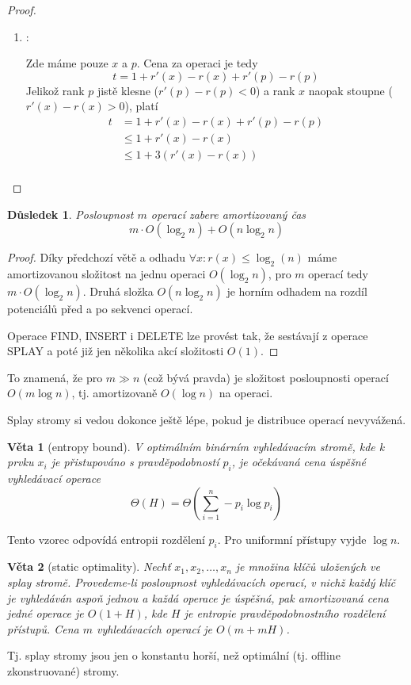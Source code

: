 \documentclass[11pt]{report} %
\newtheorem{theorem}{Věta}[section]
\newtheorem{implication}{Důsledek}[section]
\numberwithin{equation}{section}
\begin{document}
\begin{proof}
\begin{enumerate}
	
	
	\item \textbf{}:
	
	Zde máme pouze $x$ a $p$. Cena za operaci je tedy
	$$t = 1 + r'(x) - r(x) + r'(p) - r(p)$$
	Jelikož rank $p$ jistě klesne ($r'(p) - r(p) < 0$) a rank $x$ naopak stoupne ($r'(x) - r(x) > 0$), platí
	\begin{align*}
	t 	&= 1 + r'(x) - r(x) + r'(p) - r(p)\\ 
		&\leq 1 + r'(x) - r(x) \\
		&\leq 1 + 3(r'(x) - r(x))\\
	\end{align*}

	
\end{enumerate}
\end{proof}

\begin{implication}
Posloupnost $m$ operací zabere amortizovaný čas 
$$m\cdot O(\log_2n) + O(n\log_2n)$$
\end{implication}
\begin{proof}
Díky předchozí větě a odhadu $\forall x : r(x) \leq \log_2(n)$ máme amortizovanou složitost na jednu operaci $O(\log_2 n)$, pro $m$ operací tedy $m\cdot O(\log_2n)$. Druhá složka $O(n\log_2n)$ je horním odhadem na rozdíl potenciálů před a po sekvenci operací.

Operace FIND, INSERT i DELETE lze provést tak, že sestávají z operace SPLAY a poté již jen několika akcí složitosti $O(1)$.
\end{proof}

To znamená, že pro $m \gg n$ (což bývá pravda) je složitost posloupnosti operací $O(m\log n)$, tj. amortizovaně $O(\log n)$ na operaci. 

Splay stromy si vedou dokonce ještě lépe, pokud je distribuce operací nevyvážená.	

\begin{theorem}[entropy bound]
V \textit{optimálním} binárním vyhledávacím stromě, kde k prvku $x_i$ je přistupováno s pravděpodobností $p_i$, je očekávaná cena úspěšné vyhledávací operace 
$$\Theta(H) = \Theta\left(\sum_{i=1}^{n}-p_i \log p_i \right)$$
\end{theorem}
Tento vzorec odpovídá entropii rozdělení $p_i$. Pro uniformní přístupy vyjde $\log n$.

\begin{theorem}[static optimality]
Nechť $x_1, x_2, \dots, x_n$ je množina klíčů uložených ve splay stromě. Provedeme-li posloupnost vyhledávacích operací, v nichž každý klíč je vyhledáván aspoň jednou a každá operace je úspěšná, pak amortizovaná cena jedné operace je $O(1+H)$, kde $H$ je entropie pravděpodobnostního rozdělení přístupů. Cena $m$ vyhledávacích operací je $O(m+mH)$.
\end{theorem}
Tj. splay stromy jsou jen o konstantu horší, než optimální (tj. offline zkonstruované) stromy.
\end{document}

